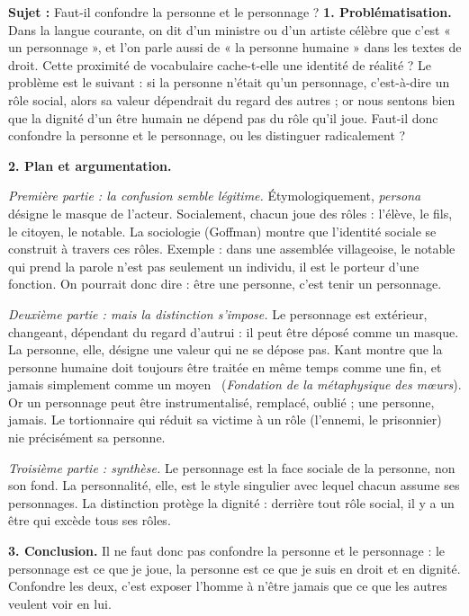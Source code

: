 \documentclass[11pt]{article}
\begin{document}
\begin{exoresolu}
\textbf{Sujet :} Faut-il confondre la personne et le personnage ?
\tcblower
\textbf{1. Problématisation.} Dans la langue courante, on dit d'un ministre ou d'un artiste célèbre que c'est « un personnage », et l'on parle aussi de « la personne humaine » dans les textes de droit. Cette proximité de vocabulaire cache-t-elle une identité de réalité ? Le problème est le suivant : si la personne n'était qu'un personnage, c'est-à-dire un rôle social, alors sa valeur dépendrait du regard des autres ; or nous sentons bien que la dignité d'un être humain ne dépend pas du rôle qu'il joue. Faut-il donc confondre la personne et le personnage, ou les distinguer radicalement ?

\textbf{2. Plan et argumentation.}

\emph{Première partie : la confusion semble légitime.} Étymologiquement, \emph{persona} désigne le masque de l'acteur. Socialement, chacun joue des rôles : l'élève, le fils, le citoyen, le notable. La sociologie (Goffman) montre que l'identité sociale se construit à travers ces rôles. Exemple : dans une assemblée villageoise, le notable qui prend la parole n'est pas seulement un individu, il est le porteur d'une fonction. On pourrait donc dire : être une personne, c'est tenir un personnage.

\emph{Deuxième partie : mais la distinction s'impose.} Le personnage est extérieur, changeant, dépendant du regard d'autrui : il peut être déposé comme un masque. La personne, elle, désigne une valeur qui ne se dépose pas. Kant montre que la personne humaine doit toujours être traitée \guillemotleft en même temps comme une fin, et jamais simplement comme un moyen \guillemotright\ (\emph{Fondation de la métaphysique des mœurs}). Or un personnage peut être instrumentalisé, remplacé, oublié ; une personne, jamais. Le tortionnaire qui réduit sa victime à un rôle (l'ennemi, le prisonnier) nie précisément sa personne.

\emph{Troisième partie : synthèse.} Le personnage est la face sociale de la personne, non son fond. La personnalité, elle, est le style singulier avec lequel chacun assume ses personnages. La distinction protège la dignité : derrière tout rôle social, il y a un être qui excède tous ses rôles.

\textbf{3. Conclusion.} Il ne faut donc pas confondre la personne et le personnage : le personnage est ce que je joue, la personne est ce que je suis en droit et en dignité. Confondre les deux, c'est exposer l'homme à n'être jamais que ce que les autres veulent voir en lui.
\end{exoresolu}
\end{document}
